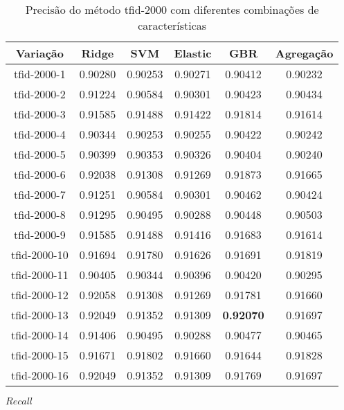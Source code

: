 \begin{table}[H]
\label{tab:precisiontfid2000}
\centering
\begin{tabular}{|c| c c  c  c  c| }
\hline
Variação &  Ridge & SVM & Elastic & GBR & Agregação  \\ 
\hline
tfid-2000-1 & 0.90280 & 0.90253 & 0.90271 & 0.90412 & 0.90232 \\
\hline
tfid-2000-2 & 0.91224 & 0.90584 & 0.90301 & 0.90423 & 0.90434 \\
\hline
tfid-2000-3 & 0.91585 & 0.91488 & 0.91422 & 0.91814 & 0.91614 \\
\hline
tfid-2000-4 & 0.90344 & 0.90253 & 0.90255 & 0.90422 & 0.90242 \\
\hline
tfid-2000-5 & 0.90399 & 0.90353 & 0.90326 & 0.90404 & 0.90240 \\
\hline
tfid-2000-6 & 0.92038 & 0.91308 & 0.91269 & 0.91873 & 0.91665 \\
\hline
tfid-2000-7 & 0.91251 & 0.90584 & 0.90301 & 0.90462 & 0.90424 \\
\hline
tfid-2000-8 & 0.91295 & 0.90495 & 0.90288 & 0.90448 & 0.90503 \\
\hline
tfid-2000-9 & 0.91585 & 0.91488 & 0.91416 & 0.91683 & 0.91614 \\
\hline
tfid-2000-10 & 0.91694 & 0.91780 & 0.91626 & 0.91691 & 0.91819 \\
\hline
tfid-2000-11 & 0.90405 & 0.90344 & 0.90396 & 0.90420 & 0.90295 \\
\hline
tfid-2000-12 & 0.92058 & 0.91308 & 0.91269 & 0.91781 & 0.91660 \\
\hline
tfid-2000-13 & 0.92049 & 0.91352 & 0.91309 & \textbf{0.92070} & 0.91697 \\
\hline
tfid-2000-14 & 0.91406 & 0.90495 & 0.90288 & 0.90477 & 0.90465 \\
\hline
tfid-2000-15 & 0.91671 & 0.91802 & 0.91660 & 0.91644 & 0.91828 \\
\hline
tfid-2000-16 & 0.92049 & 0.91352 & 0.91309 & 0.91769 & 0.91697 \\
\hline
\end{tabular}
\caption{Precisão do método tfid-2000 com diferentes combinações de características}
\end{table}

$ Recall $

